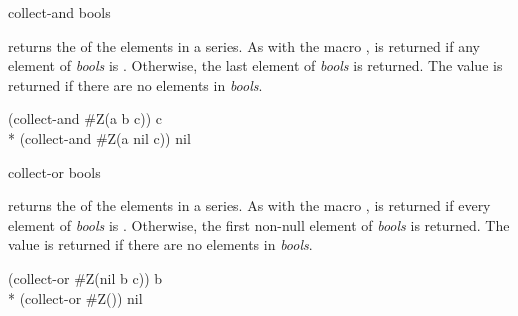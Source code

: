 \begin{defun}[Function]
collect-and bools

 returns the  of the elements in a series.  As
with the macro ,  is returned if any element of {\it
bools} is .  Otherwise, the last element of \emph{bools} is
returned.  The value  is returned if there are no elements in {\it
bools}.
\begin{lisp}
(collect-and \#Z(a b c)) {\EV} c \\*
(collect-and \#Z(a nil c)) {\EV} nil
\end{lisp}
\end{defun}

\begin{defun}[Function]
collect-or bools

 returns the  of the elements in a series.  As with
the macro ,  is returned if every element of {\it
bools} is .  Otherwise, the first non-null element of \emph{bools}
is returned.  The value  is returned if there are no elements in
\emph{bools}.
\begin{lisp}
(collect-or \#Z(nil b c)) {\EV} b \\*
(collect-or \#Z()) {\EV} nil
\end{lisp}
\end{defun}

